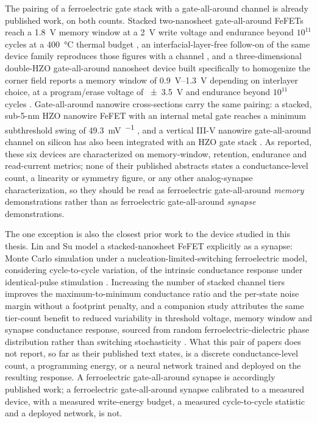 The pairing of a ferroelectric gate stack with a gate-all-around channel is already
published work, on both counts. Stacked two-nanosheet gate-all-around 
FeFETs reach a \SI{1.8}{\volt} memory window at a \SI{2}{\volt} write voltage and
endurance beyond $10^{11}$ cycles at a \SI{400}{\celsius} thermal budget
\cite{Chen2023_VLSI}, an interfacial-layer-free follow-on of the same device family
reproduces those figures with a  channel \cite{Hsieh2024_TED}, and a
three-dimensional double-HZO gate-all-around nanosheet device built specifically to
homogenize the corner field reports a memory window of \SIrange{0.9}{1.3}{\volt}
depending on interlayer choice, at a program/erase voltage of
\SI{\pm3.5}{\volt} and endurance beyond $10^{11}$ cycles \cite{Liao2022_VLSI}.
Gate-all-around nanowire cross-sections carry the same pairing: a stacked, sub-5-nm HZO
nanowire FeFET with an internal metal gate reaches a minimum subthreshold swing of
\SI{49.3}{\milli\volt\per{}} \cite{Lee2021_JEDS}, and a vertical III-V nanowire
gate-all-around channel on silicon has also been integrated with an HZO gate stack
\cite{Persson2022_EDL}. As reported, these six devices are characterized on memory-window,
retention, endurance and read-current metrics; none of their published abstracts states a
conductance-level count, a linearity or symmetry figure, or any other analog-synapse
characterization, so they should be read as ferroelectric gate-all-around \emph{memory}
demonstrations rather than as ferroelectric gate-all-around \emph{synapse}
demonstrations.

The one exception is also the closest prior work to the device studied in this thesis.
Lin and Su model a stacked-nanosheet FeFET explicitly as a synapse: Monte Carlo
simulation under a nucleation-limited-switching ferroelectric model, considering
cycle-to-cycle variation, of the intrinsic conductance response under identical-pulse
stimulation \cite{Lin2024_OJNano,Lin2023_SNW}. Increasing the number of stacked channel
tiers improves the maximum-to-minimum conductance ratio and the per-state noise margin
without a footprint penalty, and a companion study attributes the same tier-count benefit
to reduced variability in threshold voltage, memory window and synapse conductance
response, sourced from random ferroelectric-dielectric phase distribution rather than
switching stochasticity \cite{Lin2023_SNW}. What this pair of papers does not report,
so far as their published text states, is a discrete conductance-level count, a
programming energy, or a neural network trained and deployed on the resulting response.
A ferroelectric gate-all-around synapse is accordingly published work; a ferroelectric
gate-all-around synapse calibrated to a measured device, with a measured write-energy
budget, a measured cycle-to-cycle statistic and a deployed network, is not.

